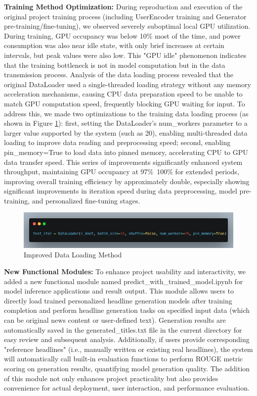 \documentclass[10pt,a4paper]{article}
\begin{document}
\textbf{Training Method Optimization:}
During reproduction and execution of the original project training process (including UserEncoder training and Generator pre-training/fine-tuning), we observed severely suboptimal local GPU utilization. During training, GPU occupancy was below 10\% most of the time, and power consumption was also near idle state, with only brief increases at certain intervals, but peak values were also low. This "GPU idle" phenomenon indicates that the training bottleneck is not in model computation but in the data transmission process. Analysis of the data loading process revealed that the original DataLoader used a single-threaded loading strategy without any memory acceleration mechanisms, causing CPU data preparation speed to be unable to match GPU computation speed, frequently blocking GPU waiting for input. To address this, we made two optimizations to the training data loading process (as shown in Figure \ref{fig:data_loader}): first, setting the DataLoader's num\_workers parameter to a larger value supported by the system (such as 20), enabling multi-threaded data loading to improve data reading and preprocessing speed; second, enabling pin\_memory=True to load data into pinned memory, accelerating CPU to GPU data transfer speed. This series of improvements significantly enhanced system throughput, maintaining GPU occupancy at 97\%~100\% for extended periods, improving overall training efficiency by approximately double, especially showing significant improvements in iteration speed during data preprocessing, model pre-training, and personalized fine-tuning stages.

\begin{figure}[H]
  \centering
  \includegraphics[width=15cm]{fig/dataloader.png}
  \caption{Improved Data Loading Method}\label{fig:data_loader}
\end{figure}

\textbf{New Functional Modules:}
To enhance project usability and interactivity, we added a new functional module named predict\_with\_trained\_model.ipynb for model inference applications and result output. This module allows users to directly load trained personalized headline generation models after training completion and perform headline generation tasks on specified input data (which can be original news content or user-defined text). Generation results are automatically saved in the generated\_titles.txt file in the current directory for easy review and subsequent analysis. Additionally, if users provide corresponding "reference headlines" (i.e., manually written or existing real headlines), the system will automatically call built-in evaluation functions to perform ROUGE metric scoring on generation results, quantifying model generation quality. The addition of this module not only enhances project practicality but also provides convenience for actual deployment, user interaction, and performance evaluation.
\end{document}
